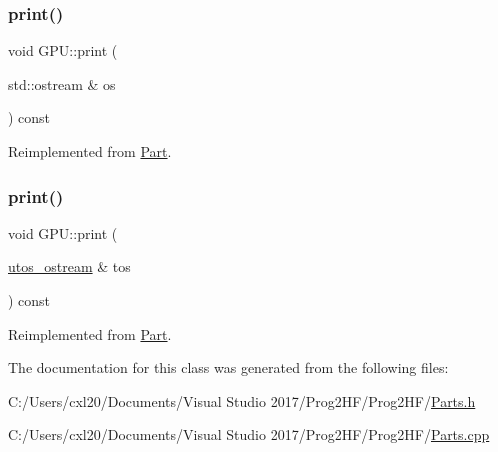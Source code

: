 \subsubsection{\texorpdfstring{print()}{print()}\hspace{0.1cm}{\footnotesize\ttfamily [1/2]}}
{\footnotesize\ttfamily void G\+P\+U\+::print (\begin{DoxyParamCaption}\item[{std\+::ostream \&}]{os }\end{DoxyParamCaption}) const\hspace{0.3cm}{\ttfamily [virtual]}}



Reimplemented from \mbox{\hyperlink{class_part_a4fa402b8e8fd4236ff773a7697ab2bc3}{Part}}.

\mbox{\label{class_g_p_u_acfa9ab35cdf1c25c324fc39c6ffc2412}} 
\subsubsection{\texorpdfstring{print()}{print()}\hspace{0.1cm}{\footnotesize\ttfamily [2/2]}}
{\footnotesize\ttfamily void G\+P\+U\+::print (\begin{DoxyParamCaption}\item[{\mbox{\hyperlink{structutos__ostream}{utos\+\_\+ostream}} \&}]{tos }\end{DoxyParamCaption}) const\hspace{0.3cm}{\ttfamily [virtual]}}



Reimplemented from \mbox{\hyperlink{class_part_a9ecabe44ba3415badf82c6a23617a41e}{Part}}.



The documentation for this class was generated from the following files\+:\begin{DoxyCompactItemize}
\item 
C\+:/\+Users/cxl20/\+Documents/\+Visual Studio 2017/\+Prog2\+H\+F/\+Prog2\+H\+F/\mbox{\hyperlink{_parts_8h}{Parts.\+h}}\item 
C\+:/\+Users/cxl20/\+Documents/\+Visual Studio 2017/\+Prog2\+H\+F/\+Prog2\+H\+F/\mbox{\hyperlink{_parts_8cpp}{Parts.\+cpp}}\end{DoxyCompactItemize}
